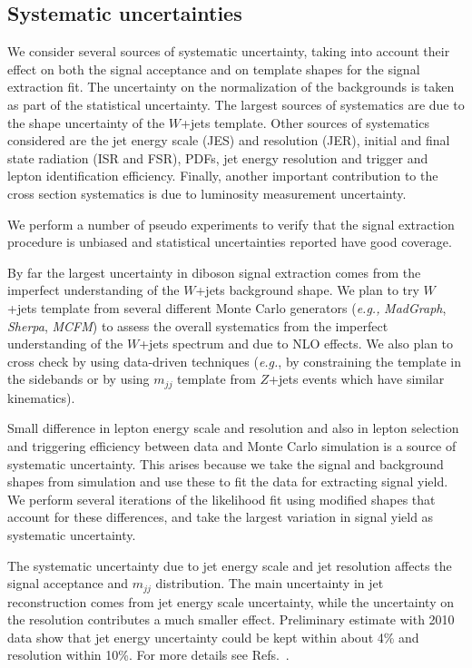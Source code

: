 \subsection{Systematic uncertainties\label{sec:syst}}
We consider several sources of systematic uncertainty, taking into account 
their effect on both the signal acceptance and on template shapes for the 
signal extraction fit. 
The uncertainty on the normalization of the backgrounds is taken as part of 
the statistical uncertainty. 
The largest sources of systematics are due to the shape uncertainty of the 
$W$+jets template. 
Other sources of systematics considered are the jet energy scale (JES) and 
resolution (JER), initial and final state radiation (ISR and FSR), PDFs, 
jet energy resolution and trigger and lepton identification efficiency. 
Finally, another important contribution to the cross section 
systematics is due to luminosity measurement uncertainty. 

\par
We perform a number of pseudo experiments to verify that 
the signal extraction procedure is unbiased and statistical 
uncertainties reported have good coverage.


\par
By far the largest uncertainty in diboson signal extraction comes 
from the imperfect understanding of the $W$+jets background shape.
We plan to try $W$+jets template from several different Monte Carlo 
generators (\textit{e.g.,} \textit{MadGraph}, \textit{Sherpa}, 
\textit{MCFM}) to assess the overall systematics from the 
imperfect understanding of the $W$+jets spectrum and due to NLO 
effects.
We also plan to cross check by using data-driven techniques 
(\textit{e.g.}, by constraining the template in the sidebands 
or by using $m_{jj}$ template from $Z$+jets events which have 
similar kinematics).

\par
Small difference in lepton energy scale and resolution and 
also in lepton selection and triggering efficiency between data and 
Monte Carlo simulation is a source of systematic uncertainty. 
This arises because we take the signal and background shapes 
from simulation and use these to fit the data for extracting signal 
yield. 
We perform several iterations of the likelihood fit using modified 
shapes that account for these differences, and take the largest 
variation in signal yield as systematic uncertainty.


\par
The systematic uncertainty due to jet energy scale and jet 
resolution affects the signal acceptance and $m_{jj}$ distribution.
The main uncertainty in jet reconstruction comes from jet 
energy scale uncertainty, while the uncertainty on the 
resolution contributes a much smaller effect.
Preliminary estimate with 2010 data show that jet energy 
uncertainty could be kept within about 4\% and resolution within 10\%.
For more details see Refs.~\cite{jme-10-010,jetsyst2}.


